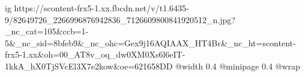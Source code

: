  
 
 
 
 

\ifcmt
  ig https://scontent-frx5-1.xx.fbcdn.net/v/t1.6435-9/82649726_2266996876942836_7126609800841920512_n.jpg?_nc_cat=105&ccb=1-5&_nc_sid=8bfeb9&_nc_ohc=Gex9j16AQIAAX_HT4Br&_nc_ht=scontent-frx5-1.xx&oh=00_AT8v_oq_dw0XM0Xs6l6eIT-1kkA_hX0TjSVcEl3X7e2kow&oe=621658DD
  @width 0.4
  @minipage 0.4
  @wrap \parpic[r]
\fi
